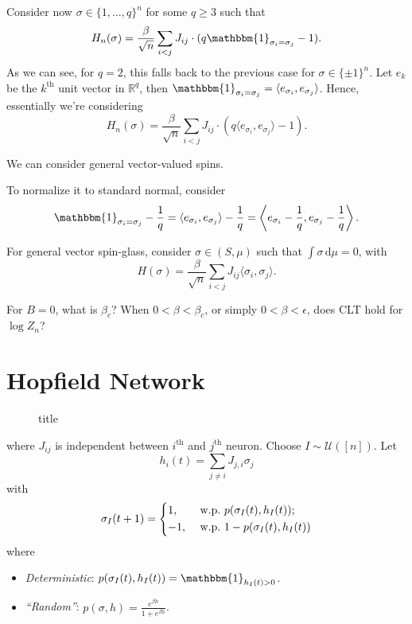 Consider now \(\sigma \in \{ 1, \dots , q \} ^n\) for some \(q \geq 3\) such that
\[
	H_n(\sigma )
	= \frac{\beta }{\sqrt{n} } \sum_{i < j} J_{ij} \cdot (q \mathbbm{1}_{\sigma _i = \sigma _j} - 1).
\]
As we can see, for \(q = 2\), this falls back to the previous case for \(\sigma \in \{ \pm 1 \} ^n\). Let \(e_k\) be the \(k^{\text{th} }\) unit vector in \(\mathbb{R} ^q\), then \(\mathbbm{1}_{\sigma _i = \sigma _j} = \langle e_{\sigma _i}, e_{\sigma _j} \rangle \). Hence, essentially we're considering
\[
	H_n(\sigma )
	= \frac{\beta }{\sqrt{n} } \sum_{i < j} J_{ij} \cdot (q \langle e_{\sigma _i}, e_{\sigma _j} \rangle  - 1).
\]
\begin{remark}
	We can consider general vector-valued spins.
\end{remark}

\begin{note}
	To normalize it to standard normal, consider
	\[
		\mathbbm{1}_{\sigma _i = \sigma _j} - \frac{1}{q}
		= \langle e_{\sigma _i}, e_{\sigma _j} \rangle - \frac{1}{q}
		= \left\langle e_{\sigma _i} - \frac{1}{q} , e_{\sigma _j} - \frac{1}{q} \right\rangle .
	\]
\end{note}

For general vector spin-glass, consider \(\sigma \in (S, \mu )\) such that \(\int \sigma \,\mathrm{d} \mu = 0\), with
\[
	H(\sigma )
	= \frac{\beta }{\sqrt{n} } \sum_{i < j} J_{ij} \langle \sigma _i, \sigma _j \rangle .
\]

\begin{problem}[Open]
For \(B=0\), what is \(\beta _c\)? When \(0 < \beta < \beta _c\), or simply \(0 < \beta < \epsilon \), does CLT hold for \(\log Z_n\)?
\end{problem}

\section{Hopfield Network}
\begin{figure}[H]
	\centering
	\caption{title}
	\label{fig:Hopfield-network}
\end{figure}
where \(J_{ij}\) is independent between \(i^{\text{th} }\) and \(j^{\text{th} }\) neuron. Choose \(I \sim \mathcal{U} ([n])\). Let
\[
	h_i(t)
	= \sum_{j \neq i} J_{j, i} \sigma _j
\]
with
\[
	\sigma _{I }(t + 1)
	= \begin{dcases}
		1,  & \text{ w.p.\ } p(\sigma _{I }(t), h_I(t)) ;   \\
		-1, & \text{ w.p.\ } 1 - p(\sigma _{I }(t), h_I(t))
	\end{dcases}
\]
where
\begin{itemize}
	\item \emph{Deterministic}: \(p(\sigma _I(t), h_I(t)) = \mathbbm{1}_{h_I(t) > 0} \).
	\item \emph{``Random''}: \(p(\sigma , h) = \frac{e^{\beta h}}{1 + e^{\beta h}}\).
\end{itemize}

